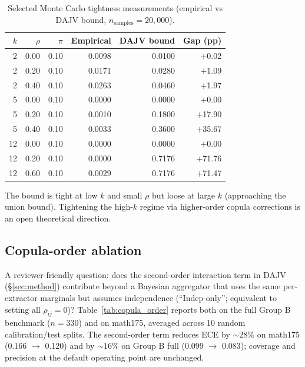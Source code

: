 \begin{table}[h]
\centering
\caption{Selected Monte Carlo tightness measurements
(empirical vs DAJV bound, $n_{\text{samples}} = 20{,}000$).}
\label{tab:tightness}
\small
\begin{tabular}{rrr rr r}
\toprule
$k$ & $\rho$ & $\pi$ & Empirical & DAJV bound & Gap (pp) \\
\midrule
2  & 0.00 & 0.10 & 0.0098 & 0.0100 & $+$0.02 \\
2  & 0.20 & 0.10 & 0.0171 & 0.0280 & $+$1.09 \\
2  & 0.40 & 0.10 & 0.0263 & 0.0460 & $+$1.97 \\
5  & 0.00 & 0.10 & 0.0000 & 0.0000 & $+$0.00 \\
5  & 0.20 & 0.10 & 0.0010 & 0.1800 & $+$17.90 \\
5  & 0.40 & 0.10 & 0.0033 & 0.3600 & $+$35.67 \\
12 & 0.00 & 0.10 & 0.0000 & 0.0000 & $+$0.00 \\
12 & 0.20 & 0.10 & 0.0000 & 0.7176 & $+$71.76 \\
12 & 0.60 & 0.10 & 0.0029 & 0.7176 & $+$71.47 \\
\bottomrule
\end{tabular}
\end{table}

The bound is tight at low $k$ and small $\rho$ but loose at large $k$
(approaching the union bound). Tightening the high-$k$ regime via
higher-order copula corrections is an open theoretical direction.

\subsection{Copula-order ablation}
\label{app:copula_order}

A reviewer-friendly question: does the second-order interaction term in
DAJV (\S\ref{sec:method}) contribute beyond a Bayesian aggregator that
uses the same per-extractor marginals but assumes independence
(``Indep-only''; equivalent to setting all $\rho_{ij} = 0$)?
Table~\ref{tab:copula_order} reports both on the full Group B benchmark
($n = 330$) and on math175, averaged across 10 random
calibration/test splits. The second-order term reduces ECE by
$\sim 28\%$ on math175 (0.166 $\to$ 0.120) and by $\sim 16\%$ on
Group B full (0.099 $\to$ 0.083); coverage and precision at the
default operating point are unchanged.

